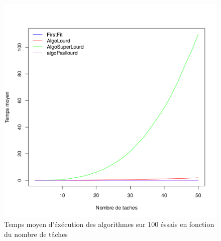 \documentclass[11pt]{article}
\begin{document}
\begin{figure}[!ht]
    \center
    \includegraphics[scale = 0.5]{temps_moyen}
    \caption{Temps moyen d'éxécution des algorithmes sur 100 éssais en fonction du nombre de tâches}
\end{figure}
\end{document}
